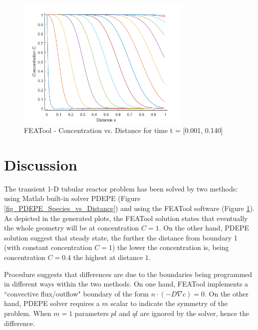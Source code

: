 \documentclass{article}
\begin{document}
\begin{figure}[h!]
\centering
\includegraphics[width=0.75\textwidth]{./img/FEATool_Concentration_vs_Distance.png}
\caption{FEATool - Concentration vs. Distance for time t = [0.001, 0.140]}
\label{FEATool_Concentration_vs_Distance}
\end{figure}



\section{Discussion}

The transient 1-D tubular reactor problem has been solved by two methods: using Matlab built-in solver PDEPE (Figure \ref{fig_PDEPE_Species_vs_Distance}) and using the FEATool software (Figure \ref{FEATool_Concentration_vs_Distance}). As depicted in the generated plots, the FEATool solution states that eventually the whole geometry will be at concentration $C = 1$. On the other hand, PDEPE solution suggest that steady state, the further the distance from boundary 1 (with constant concentration $C = 1$) the lower the concentration is, being concentration $C = 0.4$ the highest at distance $1$.

Procedure suggests that differences are due to the boundaries being programmed in different ways within the two methods. On one hand, FEATool implements a ``convective flux/outflow" boundary of the form $\displaystyle n \cdot (- D \nabla c) = 0$. On the other hand, PDEPE solver requires a $m$ scalar to indicate the symmetry of the problem. When $m = 1$ parameters $pl$ and $ql$ are ignored by the solver, hence the difference.

\printbibliography[title={References}]
\end{document}
